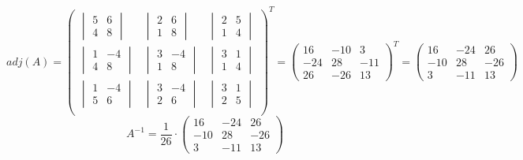 \documentclass[12pt,a4paper,fleqn]{article}
\begin{document}
\[ adj(A) =
  \begin{pmatrix}
    \begin{vmatrix} 5 & 6 \\ 4 & 8 \end{vmatrix}
    &
    \begin{vmatrix} 2 & 6 \\ 1 & 8 \end{vmatrix}
    &
    \begin{vmatrix} 2 & 5 \\ 1 & 4 \end{vmatrix} \\
    \begin{vmatrix} 1 & -4 \\ 4 & 8 \end{vmatrix}
    &
    \begin{vmatrix} 3 & -4 \\ 1 & 8 \end{vmatrix}
    &
    \begin{vmatrix} 3 & 1 \\ 1 & 4 \end{vmatrix} \\
    \begin{vmatrix} 1 & -4 \\ 5 & 6 \end{vmatrix}
    &
    \begin{vmatrix} 3 & -4 \\ 2 & 6 \end{vmatrix}
    &
    \begin{vmatrix} 3 & 1 \\ 2 & 5 \end{vmatrix} \\
  \end{pmatrix}^{T}
  =
  \begin{pmatrix}
    16 & -10 & 3 \\
    -24 & 28 & -11 \\
    26 & -26 & 13
  \end{pmatrix}^{T}
  =
  \begin{pmatrix}
    16 & -24 & 26 \\
    -10 & 28 & -26 \\
    3 & -11 & 13
  \end{pmatrix}
\]
\[
  A^{-1} = \dfrac{1}{26} \cdot
  \begin{pmatrix}
    16 & -24 & 26 \\
    -10 & 28 & -26 \\
    3 & -11 & 13
  \end{pmatrix}
\]
\end{document}
